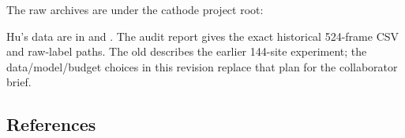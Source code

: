 The raw archives are under the cathode project root:
\begin{quote}\footnotesize{}\end{quote}
Hu's data are in  and . The audit report gives the exact historical 524-frame CSV and raw-label paths. The old  describes the earlier 144-site experiment; the data/model/budget choices in this revision replace that plan for the collaborator brief.

\subsection*{References}
\vspace{-8pt}
\begingroup\footnotesize
\renewcommand{\section}[2]{}%
